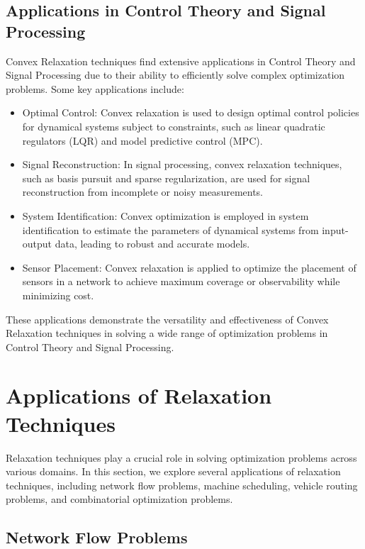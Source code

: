 \documentclass[12pt]{book} %
\begin{document}
\subsection{Applications in Control Theory and Signal Processing}

Convex Relaxation techniques find extensive applications in Control Theory and Signal Processing due to their ability to efficiently solve complex optimization problems. Some key applications include:

\begin{itemize}
    \item Optimal Control: Convex relaxation is used to design optimal control policies for dynamical systems subject to constraints, such as linear quadratic regulators (LQR) and model predictive control (MPC).
    \item Signal Reconstruction: In signal processing, convex relaxation techniques, such as basis pursuit and sparse regularization, are used for signal reconstruction from incomplete or noisy measurements.
    \item System Identification: Convex optimization is employed in system identification to estimate the parameters of dynamical systems from input-output data, leading to robust and accurate models.
    \item Sensor Placement: Convex relaxation is applied to optimize the placement of sensors in a network to achieve maximum coverage or observability while minimizing cost.
\end{itemize}

These applications demonstrate the versatility and effectiveness of Convex Relaxation techniques in solving a wide range of optimization problems in Control Theory and Signal Processing.


\section{Applications of Relaxation Techniques}

Relaxation techniques play a crucial role in solving optimization problems across various domains. In this section, we explore several applications of relaxation techniques, including network flow problems, machine scheduling, vehicle routing problems, and combinatorial optimization problems.

\subsection{Network Flow Problems}
\end{document}
